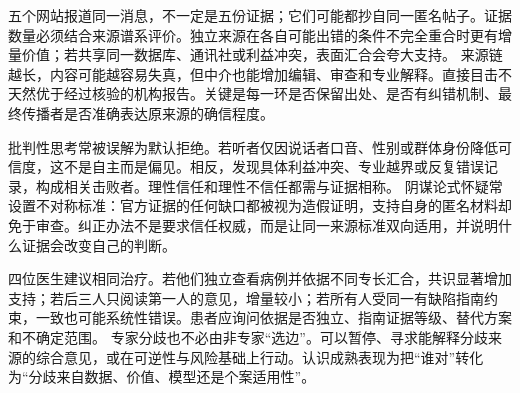 五个网站报道同一消息，不一定是五份证据；它们可能都抄自同一匿名帖子。证据数量必须结合来源谱系评价。独立来源在各自可能出错的条件不完全重合时更有增量价值；若共享同一数据库、通讯社或利益冲突，表面汇合会夸大支持。 来源链越长，内容可能越容易失真，但中介也能增加编辑、审查和专业解释。直接目击不天然优于经过核验的机构报告。关键是每一环是否保留出处、是否有纠错机制、最终传播者是否准确表达原来源的确信程度。

批判性思考常被误解为默认拒绝。若听者仅因说话者口音、性别或群体身份降低可信度，这不是自主而是偏见。相反，发现具体利益冲突、专业越界或反复错误记录，构成相关击败者。理性信任和理性不信任都需与证据相称。 阴谋论式怀疑常设置不对称标准：官方证据的任何缺口都被视为造假证明，支持自身的匿名材料却免于审查。纠正办法不是要求信任权威，而是让同一来源标准双向适用，并说明什么证据会改变自己的判断。

四位医生建议相同治疗。若他们独立查看病例并依据不同专长汇合，共识显著增加支持；若后三人只阅读第一人的意见，增量较小；若所有人受同一有缺陷指南约束，一致也可能系统性错误。患者应询问依据是否独立、指南证据等级、替代方案和不确定范围。 专家分歧也不必由非专家“选边”。可以暂停、寻求能解释分歧来源的综合意见，或在可逆性与风险基础上行动。认识成熟表现为把“谁对”转化为“分歧来自数据、价值、模型还是个案适用性”。
